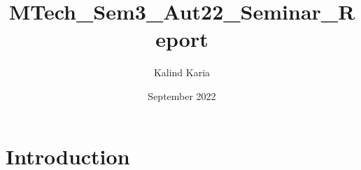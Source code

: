 \documentclass{article}
\title{MTech_Sem3_Aut22_Seminar_Report}
\author{Kalind Karia}
\date{September 2022}
\begin{document}
\maketitle

\section{Introduction}
\end{document}
